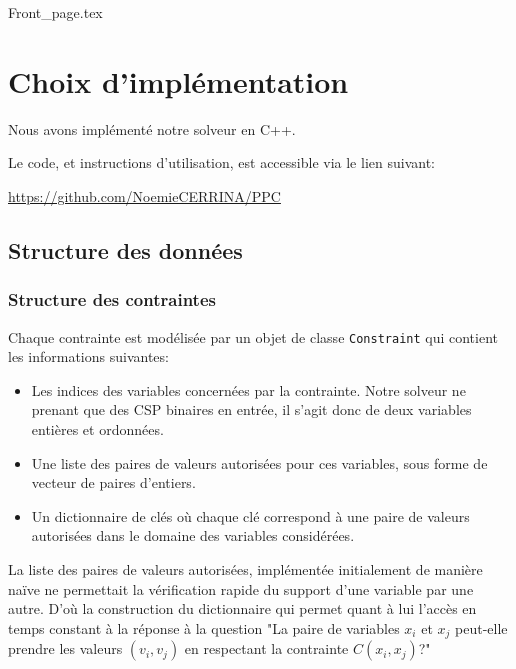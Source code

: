 \documentclass[14pt]{article}
\begin{document}
\renewcommand{\footrulewidth}{0.4pt}
\renewcommand{\headrulewidth}{0.4pt}

\vspace{0cm}              %


{Front_page.tex}

\clearpage
\thispagestyle{fancy}
\tableofcontents
\thispagestyle{fancy}      %

\clearpage

\section{Choix d'implémentation}

Nous avons implémenté notre solveur en C++.

Le code, et instructions d'utilisation, est accessible via le lien suivant:

\href{https://github.com/NoemieCERRINA/PPC}{https://github.com/NoemieCERRINA/PPC}

\subsection{Structure des données}

\subsubsection{Structure des contraintes} \label{Structure des contraintes}
Chaque contrainte est modélisée par un objet de classe \texttt{Constraint} qui contient les informations suivantes:
\begin{itemize}
	\item Les indices des variables concernées par la contrainte. Notre solveur ne prenant que des CSP binaires en entrée, il s'agit donc de deux variables entières et ordonnées.
	\item Une liste des paires de valeurs autorisées pour ces variables, sous forme de vecteur de paires d'entiers.
	\item Un dictionnaire de clés où chaque clé correspond à une paire de valeurs autorisées dans le domaine des variables considérées.
\end{itemize}

La liste des paires de valeurs autorisées, implémentée initialement de manière naïve ne permettait la vérification rapide du support d'une variable par une autre. D'où la construction du dictionnaire qui permet quant à lui l'accès en temps constant à la réponse à la question "La paire de variables $x_i$ et $x_j$ peut-elle prendre les valeurs $(v_i,v_j)$ en respectant la contrainte $C(x_i,x_j)$?"
\end{document}
